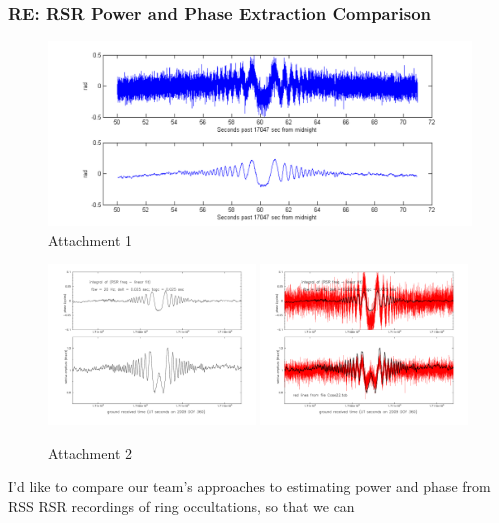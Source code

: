 \documentclass[crop=false,class=article,oneside]{standalone}
\begin{document}
\subsubsection{\footnotesize RE: RSR Power and Phase Extraction Comparison}
\begin{figure}[H]
    \centering
    \captionsetup{type=figure}
    \includegraphics[page=1,trim={2cm 0 2cm 0},clip,width=6in]{RingletPhase2009.pdf}
    \caption{Attachment 1}
\end{figure}
\begin{figure}[H]
    \centering
    \captionsetup{type=figure}
    \includegraphics[page=1,trim={2cm 0 2cm 0},clip,width=0.49\textwidth]{plot_amp_phase_jwa.pdf}
    \hfill
    \includegraphics[page=1,trim={2cm 0 1.5cm 0},clip,width=0.49\textwidth]{plot_amp_phase_compare.pdf}
    \caption{Attachment 2}
\end{figure}
I'd like to compare our team's approaches to estimating power and
phase from RSS RSR recordings of ring occultations, so that we can
\end{document}
